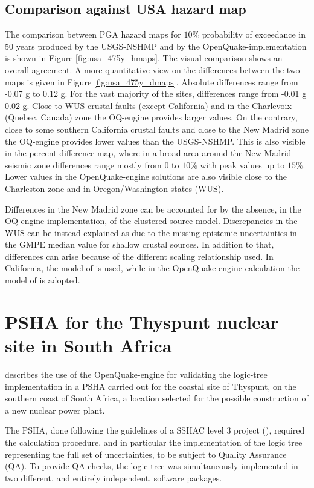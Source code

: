 \subsection{Comparison against USA hazard map}
The comparison between PGA hazard maps for $10\%$ probability of exceedance in
50 years produced by the USGS-NSHMP and by the OpenQuake-implementation is shown
in Figure \ref{fig:usa_475y_hmaps}. The visual comparison shows an overall
agreement. A more quantitative view on the differences between the two maps is
given in Figure \ref{fig:usa_475y_dmaps}. Absolute differences range from -0.07
g to 0.12 g. For the vast majority of the sites, differences range from -0.01 g
0.02 g. Close to WUS crustal faults (except California) and in the Charlevoix
(Quebec, Canada) zone the OQ-engine provides larger values. On the contrary,
close to some southern California crustal faults and close to the New Madrid
zone the OQ-engine provides lower values than the USGS-NSHMP. This is also
visible in the percent difference map, where in a broad area around the New
Madrid seismic zone differences range mostly from $0$ to $10\%$ with peak values
up to $15\%$. Lower values in the OpenQuake-engine solutions are also visible
close to the Charleston zone and in Oregon/Washington states (WUS).

Differences in the New Madrid zone can be accounted for by the absence, in the
OQ-engine implementation, of the clustered source model. Discrepancies in the
WUS can be instead explained as due to the missing epistemic uncertainties in
the GMPE median value for shallow crustal sources. In addition to that,
differences can arise because of the different scaling relationship used. In
California, the model of \cite{hanks2002} is used, while in the OpenQuake-engine
calculation the model of \cite{wells1994} is adopted.
%
\section{PSHA for the Thyspunt nuclear site in South Africa}
\citet{bommer2013} describes the use of the OpenQuake-engine for validating
the logic-tree implementation in a PSHA carried out for the coastal site of
Thyspunt, on the southern coast of South Africa, a location selected for the
possible construction of a new nuclear power plant.

The PSHA, done following the guidelines of a SSHAC level 3 project
(\cite{budnitz1997}), required the calculation procedure, and in particular the
implementation of the logic tree representing the full set of uncertainties, to
be subject to Quality Assurance (QA). To provide QA checks, the logic tree was
simultaneously implemented in two different, and entirely independent, software
packages.

